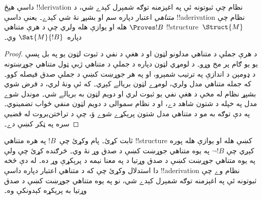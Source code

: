 \documentclass[../../../include/open-logic-section]{subfiles}
\begin{document}
\begin{cor}%
  داسې هېڅ !!{derivation} نظام چې ثبوتونه ئې په اغېزمنه توګه شمېرل کېدے شي، د \emph{متناهي}
  اعتبار دپاره سم او بشپړ نۀ شي کېدے۔ يعنې داسې !!a{derivation} نظام چې
  $\Proves !B$ هله او يوازې هله ولري چې د هرې متناهي
  !!{structure}~$\Struct{M}$ دپاره~$\Sat{M}{!B}$ وي۔
\end{cor}

\begin{proof}
  د هرې جملې د متناهي مدلونو لټون او د هغې د نفي د ثبوت لټون يو په بل پسې يو يو ګام پر مخ وړو۔ د لومړي لټون دپاره د جملې د متناهي ژبې ټول متناهي جوړښتونه د ډومېن د اندازې په ترتيب شمېرو، او په هر جوړښت کښې د جملې صدق فيصله کوو۔ که جمله متناهي مدل ولري، لومړے لټون بريالے کېږي۔ که ئې ونۀ لري، د فرض شوي بشپړ نظام له مخې د هغې نفي يو ثبوت لري او دويم لټون به بريالے شي۔ موندل شوے مدل په خپله د شتون شاهد دے، او د نظام سموالى د دويم لټون منفي ځواب تضمينوي۔ په دې توګه به مو د متناهي مدل شتون پرېکړے شوے ؤ، چې د تراختن‌بروت له قضيې سره په ټکر کښې دے۔
\end{proof}

\begin{prob}
   ثابت کړئ۔ پام وکړئ چې~$!B$
  په هره متناهي !!{structure} کښې هله او يوازې هله پوره کېږي چې
  $\lnot !B$ په يوه متناهي جوړښت کښې د صدق وړ نۀ وي۔ څرګنده کړئ چې
  ولې په يوه متناهي جوړښت کښې د صدق وړتيا د
   په معنا نيمه د پرېکړې وړ ده۔
  له دې څخه دا استدلال وکړئ چې که د متناهي اعتبار دپاره داسې
  !!a{derivation} نظام وے چې ثبوتونه ئې په اغېزمنه توګه شمېرل کېدے شي، نو په يوه متناهي جوړښت کښې د صدق وړتيا
  به پرېکړه کېدونکې وه۔
\end{prob}
\end{document}
